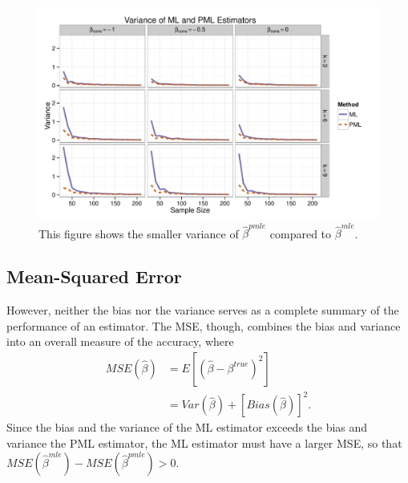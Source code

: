 \documentclass[12pt]{article}
\begin{document}
\begin{figure}[h]
\begin{center}
\includegraphics[width = \textwidth]{figs/sims-var.pdf}
\caption{This figure shows the smaller variance of $\hat{\beta}^{pmle}$ compared to $\hat{\beta}^{mle}$.}\label{fig:sims-var}
\end{center}
\end{figure}

\subsection*{Mean-Squared Error}

However, neither the bias nor the variance serves as a complete summary of the performance of an estimator.
The MSE, though, combines the bias and variance into an overall measure of the accuracy, where
\begin{align}\label{eqn:mse}
MSE(\hat{\beta}) &= E[(\hat{\beta} - \beta^{true})^2] \nonumber\\
                            &= Var(\hat{\beta}) + [Bias(\hat{\beta})]^2 \text{.}
\end{align}
Since the bias and the variance of the ML estimator exceeds the bias and variance the PML estimator, the ML estimator must have a larger MSE, so that $MSE(\hat{\beta}^{mle}) - MSE(\hat{\beta}^{pmle}) > 0$.
\end{document}
